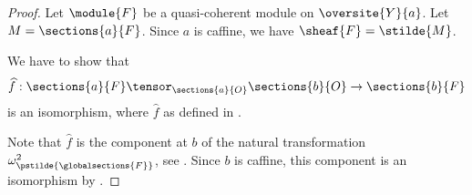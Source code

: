 
\begin{proof}
Let $\module{F}$ be a quasi-coherent module on $\oversite{Y}{a}$.
Let $M = \sections{a}{F}$.
Since $a$ is caffine, we have $\sheaf{F} = \stilde{M}$.

We have to show that
\[\widehat{f}:\sections{a}{F} \tensor_{\sections{a}{O}} \sections{b}{O} \rightarrow \sections{b}{F}\]
is an isomorphism, where $\widehat{f}$ as defined in .

Note that $\widehat{f}$ is the component at $b$ of the natural transformation $\omega^2_{\pstilde{\globalsections{F}}}$, see  .
Since $b$ is caffine, this component is an isomorphism by .
\end{proof}